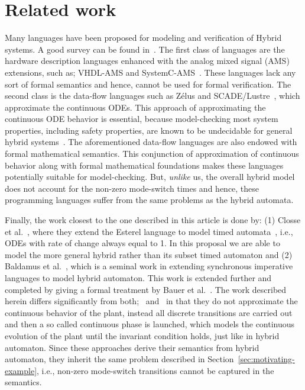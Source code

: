 \documentclass[10pt,journal,cspaper,compsoc]{IEEEtran}
\begin{document}
\section{Related work}
\label{sec:related-work}

Many languages have been proposed for modeling and verification of
Hybrid systems. A good survey can be found
in~\cite{Carloni:2006:LTH:1166403.1166404}. The first class of languages
are the hardware description languages enhanced with the analog mixed
signal (AMS) extensions, such as; VHDL-AMS and
SystemC-AMS~\cite{1205169,Pecheux:2006:VVA:2298529.2301129}. These
languages lack any sort of formal semantics and hence, cannot be used
for formal verification. The second class is the data-flow languages
such as Z\'elus and
SCADE/Lustre~\cite{DBLP:conf/hybrid/BourkeP13,nhal91}, which approximate
the continuous ODEs. This approach of approximating the continuous ODE
behavior is essential, because model-checking most system properties,
including safety properties, are known to be undecidable for general
hybrid systems~\cite{Henzinger:1996:THA:788018.788803}. The
aforementioned data-flow languages are also endowed with formal
mathematical semantics.  This conjunction of approximation of continuous
behavior along with formal mathematical foundations makes these
languages potentially suitable for model-checking. But, \textit{unlike}
us, the overall hybrid model does not account for the non-zero
mode-switch times and hence, these programming languages suffer from the
same problems as the hybrid automata.

Finally, the work closest to the one described in this article is done
by: (1) Closse et al.~\cite{bertin2001taxys}, where they extend the
Esterel language to model timed automata~\cite{alur94}, i.e., ODEs with
rate of change always equal to 1. In this proposal we are able to model
the more general hybrid rather than its subset timed automaton and (2)
Baldamus et al.~\cite{baldamus2002modifying}, which is a seminal work in
extending synchronous imperative languages to model hybrid
automaton. This work is extended further and completed by giving a
formal treatment by Bauer et al.~\cite{bauer2010synchronous}. The work
described herein differs significantly from
both;~\cite{bauer2010synchronous} and~\cite{baldamus2002modifying} in
that they do not approximate the continuous behavior of the plant,
instead all discrete transitions are carried out and then a so called
continuous phase is launched, which models the continuous evolution of
the plant until the invariant condition holds, just like in hybrid
automaton. Since these approaches derive their semantics from hybrid
automaton, they inherit the same problem described in
Section~\ref{sec:motivating-example}, i.e., non-zero mode-switch
transitions cannot be captured in the semantics.
\end{document}
